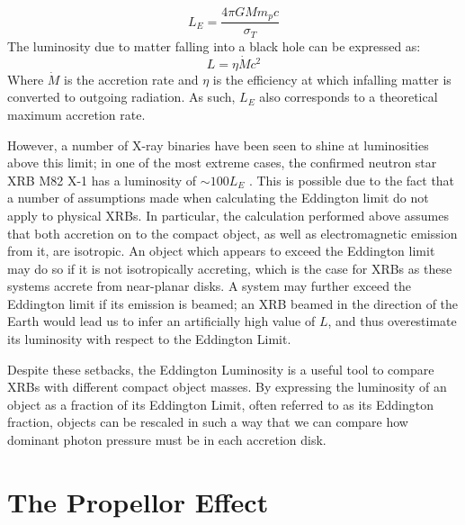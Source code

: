 \begin{equation}
L_E=\frac{4\pi GMm_pc}{\sigma_T}
\end{equation}
The luminosity due to matter falling into a black hole can be expressed as:
\begin{equation}
L=\eta\dot{M}c^2
\end{equation}
Where $\dot{M}$ is the accretion rate and $\eta$ is the efficiency at which infalling matter is converted to outgoing radiation.  As such, $L_E$ also corresponds to a theoretical maximum accretion rate.
\par However, a number of X-ray binaries have been seen to shine at luminosities above this limit; in one of the most extreme cases, the confirmed neutron star XRB M82 X-1 has a luminosity of $\sim100L_E$ \citep{Bachetti_M82X1}.  This is possible due to the fact that a number of assumptions made when calculating the Eddington limit do not apply to physical XRBs.  In particular, the calculation performed above assumes that both accretion on to the compact object, as well as electromagnetic emission from it, are isotropic.  An object which appears to exceed the Eddington limit may do so if it is not isotropically accreting, which is the case for XRBs as these systems accrete from near-planar disks.  A system may further exceed the Eddington limit if its emission is beamed; an XRB beamed in the direction of the Earth would lead us to infer an artificially high value of $L$, and thus overestimate its luminosity with respect to the Eddington Limit.
\par Despite these setbacks, the Eddington Luminosity is a useful tool to compare XRBs with different compact object masses.  By expressing the luminosity of an object as a fraction of its Eddington Limit, often referred to as its Eddington fraction, objects can be rescaled in such a way that we can compare how dominant photon pressure must be in each accretion disk.

\section{The Propellor Effect}

